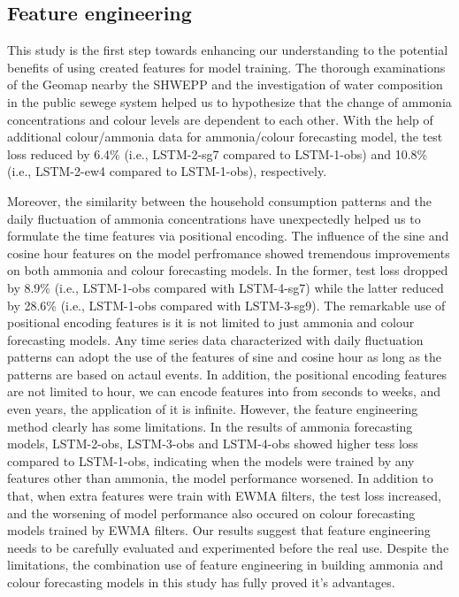 
\subsection{Feature engineering}
This study is the first step towards enhancing our understanding to the potential benefits of using created features for model training. The thorough examinations of the Geomap nearby the SHWEPP and the investigation of water composition in the public sewege system helped us to hypothesize that the change of ammonia concentrations and colour levels are dependent to each other. With the help of additional colour/ammonia data for ammonia/colour forecasting model, the test loss reduced by 6.4\% (i.e., LSTM-2-sg7 compared to LSTM-1-obs) and 10.8\% (i.e., LSTM-2-ew4 compared to LSTM-1-obs), respectively. 

Moreover, the similarity between the household consumption patterns and the daily fluctuation of ammonia concentrations have unexpectedly helped us to formulate the time features via positional encoding. The influence of the sine and cosine hour features on the model perfromance showed tremendous improvements on both ammonia and colour forecasting models. In the former, test loss dropped by 8.9\% (i.e., LSTM-1-obs compared with LSTM-4-sg7) while the latter reduced by 28.6\% (i.e., LSTM-1-obs compared with LSTM-3-sg9). The remarkable use of positional encoding features is it is not limited to just ammonia and colour forecasting models. Any time series data characterized with daily fluctuation patterns can adopt the use of the features of sine and cosine hour as long as the patterns are based on actaul events. In addition, the positional encoding features are not limited to hour, we can encode features into from seconds to weeks, and even years, the application of it is infinite. However, the feature engineering method clearly has some limitations. In the results of ammonia forecasting models, LSTM-2-obs, LSTM-3-obs and LSTM-4-obs showed higher tess loss compared to LSTM-1-obs, indicating when the models were trained by any features other than ammonia, the model performance worsened. In addition to that, when extra features were train with EWMA filters, the test loss increased, and the worsening of model performance also occured on colour forecasting models trained by EWMA filters. Our results suggest that feature engineering needs to be carefully evaluated and experimented before the real use. Despite the limitations, the combination use of feature engineering in building ammonia and colour forecasting models in this study has fully proved it's advantages. 

